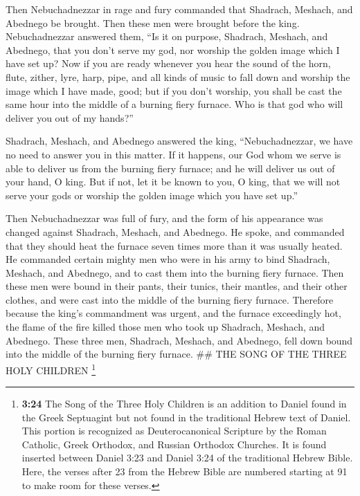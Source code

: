  Then Nebuchadnezzar in rage and fury commanded that
Shadrach, Meshach, and Abednego be brought. Then these men were brought
before the king.  Nebuchadnezzar answered them, ``Is it
on purpose, Shadrach, Meshach, and Abednego, that you don't serve my
god, nor worship the golden image which I have set up? 
Now if you are ready whenever you hear the sound of the horn, flute,
zither, lyre, harp, pipe, and all kinds of music to fall down and
worship the image which I have made, good; but if you don't worship, you
shall be cast the same hour into the middle of a burning fiery furnace.
Who is that god who will deliver you out of my hands?''

 Shadrach, Meshach, and Abednego answered the king,
``Nebuchadnezzar, we have no need to answer you in this matter.
 If it happens, our God whom we serve is able to deliver
us from the burning fiery furnace; and he will deliver us out of your
hand, O king.  But if not, let it be known to you, O
king, that we will not serve your gods or worship the golden image which
you have set up.''

 Then Nebuchadnezzar was full of fury, and the form of
his appearance was changed against Shadrach, Meshach, and Abednego. He
spoke, and commanded that they should heat the furnace seven times more
than it was usually heated.  He commanded certain mighty
men who were in his army to bind Shadrach, Meshach, and Abednego, and to
cast them into the burning fiery furnace.  Then these men
were bound in their pants, their tunics, their mantles, and their other
clothes, and were cast into the middle of the burning fiery furnace.
 Therefore because the king's commandment was urgent, and
the furnace exceedingly hot, the flame of the fire killed those men who
took up Shadrach, Meshach, and Abednego.  These three
men, Shadrach, Meshach, and Abednego, fell down bound into the middle of
the burning fiery furnace. \#\# THE SONG OF THE THREE HOLY CHILDREN
\footnote{\textbf{3:24} The Song of the Three Holy Children is an
  addition to Daniel found in the Greek Septuagint but not found in the
  traditional Hebrew text of Daniel. This portion is recognized as
  Deuterocanonical Scripture by the Roman Catholic, Greek Orthodox, and
  Russian Orthodox Churches. It is found inserted between Daniel 3:23
  and Daniel 3:24 of the traditional Hebrew Bible. Here, the verses
  after 23 from the Hebrew Bible are numbered starting at 91 to make
  room for these verses.}

